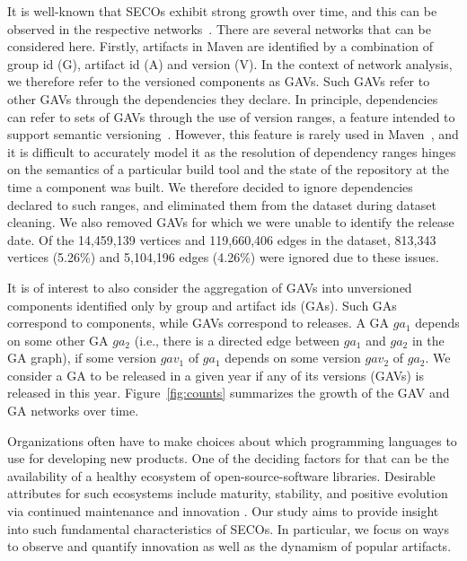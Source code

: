 \documentclass[10pt,conference]{IEEEtran}
\begin{document}
It is well-known that SECOs exhibit strong growth over time,
and this can be observed in the respective
networks~\cite{decan2019empirical,wittern2016look,
kikas2017structure, decan2016topology}. There are several
networks that can be considered here. Firstly, artifacts in
Maven are identified by a combination of group id (G), artifact
id (A) and version (V). In the context of network analysis, we
therefore refer to the versioned components as GAVs. Such GAVs
refer to other GAVs through the dependencies they declare. In
principle, dependencies can refer to sets of GAVs through the
use of version ranges, a feature intended to support semantic
versioning~\cite{semver}. However, this feature is rarely used
in Maven~\cite{dietrich2019dependency}, and it is difficult to accurately model
it as the resolution of dependency ranges hinges on the semantics of a particular build tool and the state of the repository at the time a component was built. 
We therefore decided to ignore dependencies declared to such ranges, and eliminated them from the dataset during dataset cleaning. We also removed GAVs for which we were unable to identify the release date. 
Of the 14,459,139 vertices and 119,660,406 edges in the dataset, 813,343 vertices (5.26\%) and 5,104,196 edges (4.26\%)  were ignored due to these issues. 

It is of interest to also consider the aggregation of GAVs into
unversioned components identified only by group and artifact
ids (GAs). Such GAs correspond to components, while GAVs
correspond to releases. A GA $ga_1$ depends on some other GA
$ga_2$ (i.e., there is a directed edge between $ga_1$ and
$ga_2$ in the GA graph), if some version $gav_1$ of $ga_1$
depends on some version $gav_2$ of $ga_2$. We consider a GA to
be released in a given year if any of its versions (GAVs) is
released in this year. Figure~\ref{fig:counts} summarizes the
growth of the GAV and GA networks over time. 

Organizations often have to make choices about which
programming languages to use for developing new products. One
of the deciding factors for that can be the availability of a
healthy ecosystem of open-source-software libraries. Desirable
attributes for such ecosystems include maturity, stability,
and positive evolution via continued maintenance and
innovation \cite{farshidi2021decision,dijkers2018exploring}.
Our study aims to provide insight into such fundamental
characteristics of SECOs. In particular, we focus on ways to
observe and quantify innovation as well as the dynamism of
popular artifacts.
\end{document}
